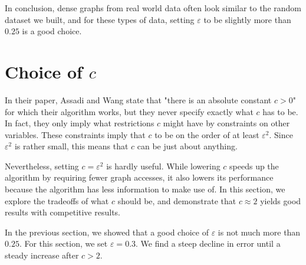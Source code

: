 \documentclass[
]{article}
\begin{document}
In conclusion, dense graphs from real world data often look similar to the random dataset
we built, and for these types of data, setting {\(\varepsilon\)} to be
slightly more than {\(0.25\)} is a good choice.

\hypertarget{choice-of-c}{%
  \section{\texorpdfstring{Choice of
        {\(c\)}}{Choice of c}}\label{choice-of-c}}

In their paper, Assadi and Wang state that "there is an absolute
constant {\(c > 0\)}" for which their algorithm works, but they never
specify exactly what {\(c\)} has to be. In fact, they only imply what
restrictions {\(c\)} might have by constraints on other variables. These
constraints imply that {\(c\)} to be on the order of at least
  {\(\varepsilon^{2}\)}. Since {\(\varepsilon^{2}\)} is rather small, this
means that {\(c\)} can be just about anything.

Nevertheless, setting {\(c = \varepsilon^{2}\)} is hardly useful. While
lowering {\(c\)} speeds up the algorithm by requiring fewer graph
accesses, it also lowers its performance because the algorithm has less
information to make use of. In this section, we explore the tradeoffs of
what {\(c\)} should be, and demonstrate that {\(c \approx 2\)} yields
good results with competitive results.

In the previous section, we showed that a good choice of
  {\(\varepsilon\)} is not much more than {\(0.25\)}. For this section, we
set {\(\varepsilon = 0.3\)}. We find a steep decline in error until a steady increase after $c > 2$.
\end{document}
